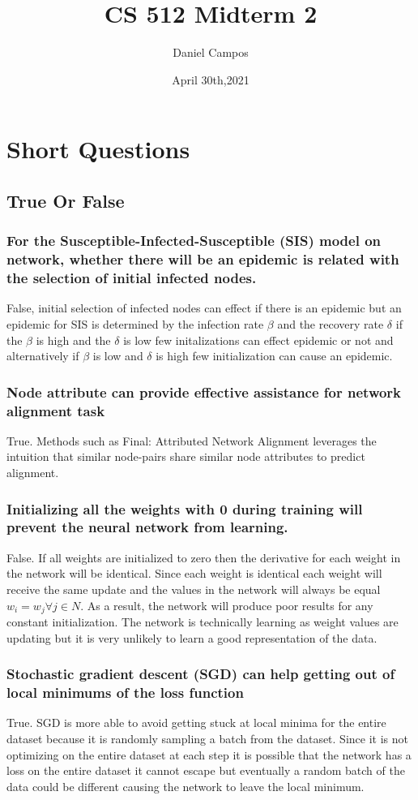 \documentclass[11pt]{article}
\title{CS 512 Midterm 2}
\author{Daniel Campos}
\date{April 30th,2021}
\begin{document}
\maketitle
\section{Short Questions}
\subsection{True Or False}
\subsubsection{For the Susceptible-Infected-Susceptible (SIS) model on network, whether there will be an epidemic is related with the selection of initial infected nodes.}
False, initial selection of infected nodes can effect if there is an epidemic but an epidemic for SIS is determined by the infection rate $\beta$ and the recovery rate $\delta$ if the $\beta$ is high and the $\delta$ is low few initalizations can effect epidemic or not and alternatively if $\beta$ is low and $\delta$ is high few initialization can cause an epidemic.
\subsubsection{Node attribute can provide effective assistance for network alignment task}
True. Methods such as Final: Attributed Network Alignment leverages the intuition that similar node-pairs share similar node attributes to predict alignment.
\subsubsection{Initializing all the weights with 0 during training will prevent the neural network from learning.}
False. If all weights are initialized to zero then the derivative for each weight in the network will be identical. Since each weight is identical each weight will receive the same update and the values in the network will always be equal $w_i = w_j \forall j \in N$. As a result, the network will produce poor results for any constant initialization. The network is technically learning as weight values are updating but it is very unlikely to learn a good representation of the data. 
\subsubsection{Stochastic gradient descent (SGD) can help getting out of local minimums of the loss function}
True. SGD is more able to avoid getting stuck at local minima for the entire dataset because it is randomly sampling a batch from the dataset. Since it is not optimizing on the entire dataset at each step it is possible that the network has a loss on the entire dataset it cannot escape but eventually a random batch of the data could be different causing the network to leave the local minimum.
\end{document}

